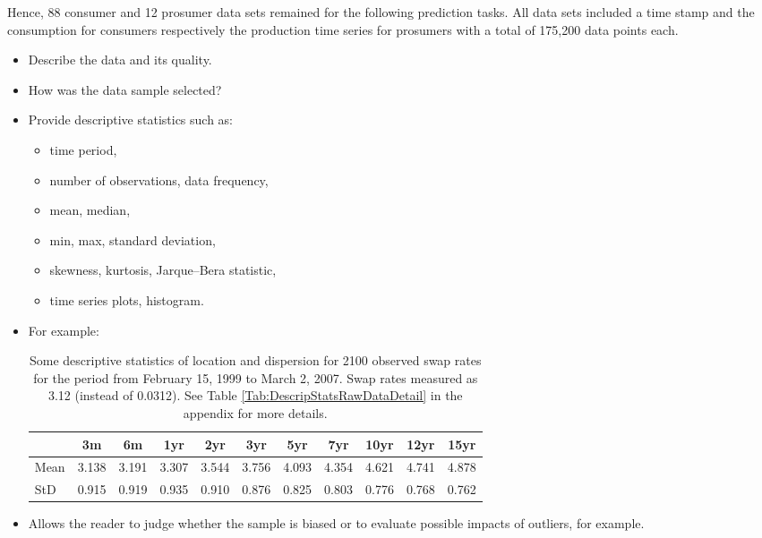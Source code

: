 Hence, 88 consumer and 12 prosumer data sets remained for the following prediction tasks. All data sets included a time stamp and the consumption for consumers respectively the production time series for prosumers with a total of 175,200 data points each.



\begin{itemize}

    \item Describe the data and its quality.
    \item How was the data sample selected?
    \item Provide descriptive statistics such as:
        \begin{itemize}
            \item time period,
            \item number of observations, data frequency,
            \item mean, median,
            \item min, max, standard deviation,
            \item skewness, kurtosis, Jarque--Bera statistic,
            \item time series plots, histogram.
        \end{itemize}
    \item For example:
        \begin{table}[ht]

        \begin{center}
            {\footnotesize
            \begin{tabular}{l|cccccccccc}
                \hline \hline
                           & 3m    & 6m    & 1yr   & 2yr   & 3yr   & 5yr   & 7yr   & 10yr  & 12yr  & 15yr   \\
                \hline
                    Mean   & 3.138 & 3.191 & 3.307 & 3.544 & 3.756 & 4.093 & 4.354 & 4.621 & 4.741 & 4.878  \\
                    StD    & 0.915 & 0.919 & 0.935 & 0.910 & 0.876 & 0.825 & 0.803 & 0.776 & 0.768 & 0.762  \\
                \hline \hline
            \end{tabular}}
        \end{center}
        \caption{Some descriptive statistics of location and dispersion for
        2100 observed swap rates for the period from February 15, 1999
        to March 2, 2007. Swap rates measured as 3.12 (instead of 0.0312). See Table
        \ref{Tab:DescripStatsRawDataDetail} in the appendix for
        more details.}
        \label{Tab:DescripStatsRawData}
        \end{table}

    \item Allows the reader to judge whether the sample is biased or to evaluate possible impacts of outliers, for
    example.

\end{itemize}
